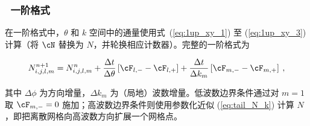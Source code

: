 \vssub
\subsubsection{~一阶格式}

\noindent
在一阶格式中，$\theta$ 和 $k$ 空间中的通量使用式~(\ref{eq:1up_xy_1}) 至 (\ref{eq:1up_xy_3}) 计算（将 $\cN$ 替换为 $N$，并轮换相应计数器）。完整的一阶格式为


\begin{equation}
N_{i,j,l,m}^{n+1} = N_{i,j,l,m}^n 
 + \frac{\Delta t}{\Delta \theta} \left [ \cF_{l,-} - \cF_{l,+} \right ]
 + \frac{\Delta t}{\Delta k_m} \left [ \cF_{m,-} - \cF_{m,+} \right ]
\: , \label{eq:1up_intra_tot} \end{equation}

\noindent
其中 $\Delta \phi$ 为方向增量，$\Delta k_m$ 为（局地）波数增量。低波数边界条件通过对 $m=1$ 取 $\cF_{m,-}=0$ 施加；高波数边界条件则使用参数化近似 (\ref{eq:tail_N_k}) 计算 $N$，即把离散网格向高波数方向扩展一个网格点。
